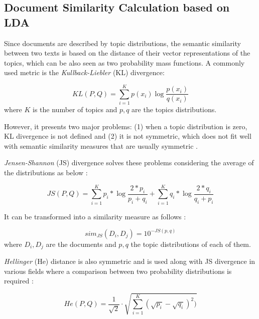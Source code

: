 \subsection{Document Similarity Calculation based on LDA}\label{sec:doc-sim-lda}

Since documents are described by topic distributions, the semantic similarity between two texts is based on the distance of their vector representations of the topics, which can be also seen as two probability mass functions. A commonly used metric is the \textit{Kullback-Liebler} (KL) divergence:

\begin{equation}
KL(P,Q) = \sum\limits_{i=1}^K p(x_{i}) \log \frac{p(x_{i})}{q(x_{i})}
\label{eq:kl}
\end{equation}
where  $K$ is the number of topics and $p,q$ are the topics distributions.

However, it presents two major problems: (1) when a topic distribution is zero, KL divergence is not defined and (2) it is not symmetric, which does not fit well with semantic similarity measures that are usually symmetric \citep{Rus2013}.

\textit{Jensen-Shannon} (JS) divergence \citep{Rao1982,Lin1991} solves these problems considering the average of the distributions as below \citep{Celikyilmaz2010}:

\begin{equation}
JS(P,Q) = \sum\limits_{i=1}^K p_{i}*\log \frac{2*p_{i}}{p_{i}+q_{i}}  +  \sum\limits_{i=1}^K q_{i}*\log \frac{2*q_{i}}{q_{i}+p_{i}}
\label{eq:jsdivergence}
\end{equation}


It can be transformed into a similarity measure as follows \citep{Dagan1998} :

\begin{equation}
sim_{JS}(D_i , D_j) = 10^{- JS(p,q)}
\label{eq:simjs}
\end{equation}
where  $D_i,D_j$ are the documents and $p,q$ the topic distributions of each of them.


\textit{Hellinger} (He) distance is also symmetric and is used along with JS divergence in various fields where a comparison between two probability distributions is required \citep{Blei2007a,Hall2008,Boyd-Graber2010}:

\begin{equation}
	He(P, Q) = \frac{1}{\sqrt{2}}\cdot\sqrt{\sum\limits_{i=1}^K (\sqrt{p_i} - \sqrt{q_i})^2)}
	\label{eq:hedistance}
\end{equation}

